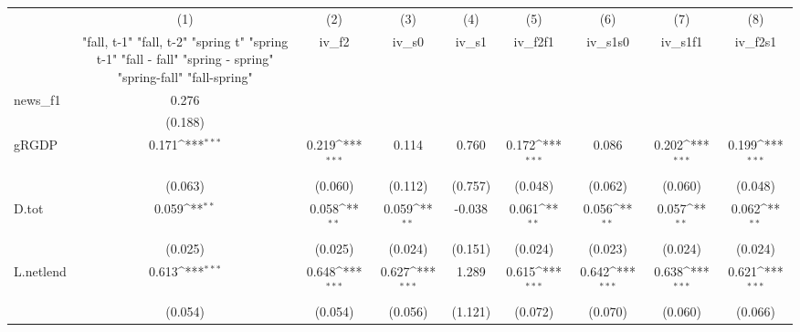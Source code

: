 {
\def\sym#1{\ifmmode^{#1}\else\(^{#1}\)\fi}
\begin{tabular}{l*{8}{c}}
\toprule
            &\multicolumn{1}{c}{(1)}&\multicolumn{1}{c}{(2)}&\multicolumn{1}{c}{(3)}&\multicolumn{1}{c}{(4)}&\multicolumn{1}{c}{(5)}&\multicolumn{1}{c}{(6)}&\multicolumn{1}{c}{(7)}&\multicolumn{1}{c}{(8)}\\
            &\multicolumn{1}{c}{  "fall, t-1" "fall, t-2" "spring t" "spring t-1"  "fall - fall" "spring - spring" "spring-fall" "fall-spring" }&\multicolumn{1}{c}{iv\_f2}&\multicolumn{1}{c}{iv\_s0}&\multicolumn{1}{c}{iv\_s1}&\multicolumn{1}{c}{iv\_f2f1}&\multicolumn{1}{c}{iv\_s1s0}&\multicolumn{1}{c}{iv\_s1f1}&\multicolumn{1}{c}{iv\_f2s1}\\
\midrule
news\_f1     &       0.276         &                     &                     &                     &                     &                     &                     &                     \\
            &     (0.188)         &                     &                     &                     &                     &                     &                     &                     \\
\addlinespace
gRGDP       &       0.171\sym{***}&       0.219\sym{***}&       0.114         &       0.760         &       0.172\sym{***}&       0.086         &       0.202\sym{***}&       0.199\sym{***}\\
            &     (0.063)         &     (0.060)         &     (0.112)         &     (0.757)         &     (0.048)         &     (0.062)         &     (0.060)         &     (0.048)         \\
\addlinespace
D.tot       &       0.059\sym{**} &       0.058\sym{**} &       0.059\sym{**} &      -0.038         &       0.061\sym{**} &       0.056\sym{**} &       0.057\sym{**} &       0.062\sym{**} \\
            &     (0.025)         &     (0.025)         &     (0.024)         &     (0.151)         &     (0.024)         &     (0.023)         &     (0.024)         &     (0.024)         \\
\addlinespace
L.netlend   &       0.613\sym{***}&       0.648\sym{***}&       0.627\sym{***}&       1.289         &       0.615\sym{***}&       0.642\sym{***}&       0.638\sym{***}&       0.621\sym{***}\\
            &     (0.054)         &     (0.054)         &     (0.056)         &     (1.121)         &     (0.072)         &     (0.070)         &     (0.060)         &     (0.066)         \\

\end{tabular}}
